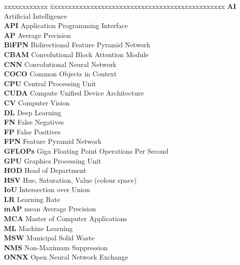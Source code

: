 \documentclass[BTech]{audiss}
\begin{document}
\abbreviations
\noindent
\begin{tabbing}
xxxxxxxxxxxx \= xxxxxxxxxxxxxxxxxxxxxxxxxxxxxxxxxxxxxxxxxxxxxxxx \kill
\textbf{AI}      \> Artificial Intelligence \\
\textbf{API}     \> Application Programming Interface \\
\textbf{AP}      \> Average Precision \\
\textbf{BiFPN}   \> Bidirectional Feature Pyramid Network \\
\textbf{CBAM}    \> Convolutional Block Attention Module \\
\textbf{CNN}     \> Convolutional Neural Network \\
\textbf{COCO}    \> Common Objects in Context \\
\textbf{CPU}     \> Central Processing Unit \\
\textbf{CUDA}    \> Compute Unified Device Architecture \\
\textbf{CV}      \> Computer Vision \\
\textbf{DL}      \> Deep Learning \\
\textbf{FN}      \> False Negatives \\
\textbf{FP}      \> False Positives \\
\textbf{FPN}     \> Feature Pyramid Network \\
\textbf{GFLOPs}  \> Giga Floating Point Operations Per Second \\
\textbf{GPU}     \> Graphics Processing Unit \\
\textbf{HOD}     \> Head of Department \\
\textbf{HSV}     \> Hue, Saturation, Value (colour space) \\
\textbf{IoU}     \> Intersection over Union \\
\textbf{LR}      \> Learning Rate \\
\textbf{mAP}     \> mean Average Precision \\
\textbf{MCA}     \> Master of Computer Applications \\
\textbf{ML}      \> Machine Learning \\
\textbf{MSW}     \> Municipal Solid Waste \\
\textbf{NMS}     \> Non-Maximum Suppression \\
\textbf{ONNX}    \> Open Neural Network Exchange \\

\end{tabbing}
\end{document}
